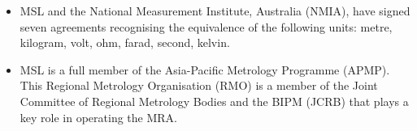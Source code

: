 \begin{itemize}
\item	MSL and the National Measurement Institute, Australia (NMIA), have signed seven agreements recognising the equivalence of the following units: metre, kilogram, volt, ohm, farad, second, kelvin.

\item	MSL is a full member of the Asia-Pacific Metrology Programme (APMP). This Regional Metrology Organisation (RMO) is a member of the Joint Committee of Regional Metrology Bodies and the BIPM (JCRB) that plays a key role in operating the MRA.
\end{itemize} 
